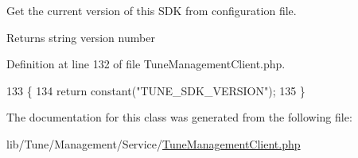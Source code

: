 Get the current version of this S\-D\-K from configuration file. 

\begin{DoxyReturn}{Returns}
string version number 
\end{DoxyReturn}


Definition at line 132 of file Tune\-Management\-Client.\-php.


\begin{DoxyCode}
133     \{
134         \textcolor{keywordflow}{return} constant(\textcolor{stringliteral}{"TUNE\_SDK\_VERSION"});
135     \}
\end{DoxyCode}


The documentation for this class was generated from the following file\-:\begin{DoxyCompactItemize}
\item 
lib/\-Tune/\-Management/\-Service/\hyperlink{TuneManagementClient_8php}{Tune\-Management\-Client.\-php}\end{DoxyCompactItemize}
